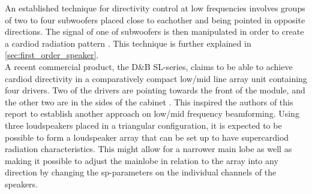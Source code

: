 An established technique for directivity control at low frequencies involves groups of two to four subwoofers placed close to eachother and being pointed in opposite directions. The signal of one of subwoofers is then manipulated in order to create a cardiod radiation pattern \citep{KS28}. This technique is further explained in \autoref{sec:first_order_speaker}.\\
A recent commercial product, the D\&B SL-series, claims to be able to achieve cardiod directivity in a comparatively compact low/mid line array unit containing four drivers. Two of the drivers are pointing towards the front of the module, and the other two are in the sides of the cabinet \citep{SL_GSL}. This inspired the authors of this report to establish another approach on low/mid frequency beamforming. Using three loudspeakers placed in a triangular configuration, it is expected to be possible to form a loudspeaker array that can be set up to have supercardiod radiation characteristics. This might allow for a narrower main lobe as well as making it possible to adjust the mainlobe in relation to the array into any direction by changing the \gls{sp}-parameters on the individual channels of the speakers.







